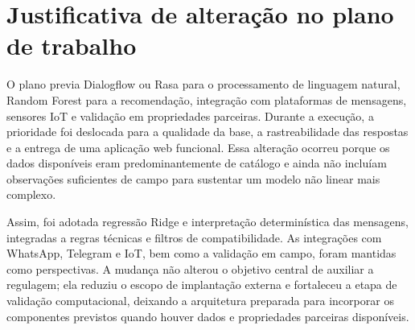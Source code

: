 \documentclass[12pt,a4paper]{article}
\begin{document}
\section{Justificativa de alteração no plano de trabalho}

O plano previa Dialogflow ou Rasa para o processamento de linguagem natural, Random Forest para a recomendação, integração com plataformas de mensagens, sensores IoT e validação em propriedades parceiras. Durante a execução, a prioridade foi deslocada para a qualidade da base, a rastreabilidade das respostas e a entrega de uma aplicação web funcional. Essa alteração ocorreu porque os dados disponíveis eram predominantemente de catálogo e ainda não incluíam observações suficientes de campo para sustentar um modelo não linear mais complexo.

Assim, foi adotada regressão Ridge e interpretação determinística das mensagens, integradas a regras técnicas e filtros de compatibilidade. As integrações com WhatsApp, Telegram e IoT, bem como a validação em campo, foram mantidas como perspectivas. A mudança não alterou o objetivo central de auxiliar a regulagem; ela reduziu o escopo de implantação externa e fortaleceu a etapa de validação computacional, deixando a arquitetura preparada para incorporar os componentes previstos quando houver dados e propriedades parceiras disponíveis.
\end{document}

